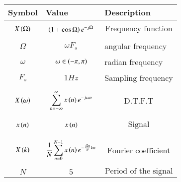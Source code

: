 \begin{tabular}{|p{2cm}|p{2.80cm}|p{2.70cm}|}
    \hline
    Symbol&Value&Description\\ \hline
    $$X\left(\Omega\right)$$&$$\left(1+\cos{\Omega}\right)e^{-j\Omega}$$&$$\text{Frequency function}$$\\\hline
    $$\Omega$$&$$\omega F_{s}$$&angular frequency\\\hline
    $$\omega$$&$$\omega \in \left(-\pi,\pi\right)$$&radian frequency\\\hline
    $$F_{s}$$&$$1Hz$$&Sampling frequency\\\hline
    $$X\left(\omega\right)$$&$$\sum^{\infty}_{n=-\infty}x\left(n\right)e^{-j\omega n}$$&$$\text{D.T.F.T}$$\\\hline
    $$x\left(n\right)$$&$$x\left(n\right)$$&$$\text{Signal}$$\\\hline
    $$X\left(k\right)$$&$$\frac{1}{N}\sum^{N-1}_{n=0}x\left(n\right)e^{-\frac{j2\pi}{N}kn}$$&$$\text{Fourier coefficient}$$\\\hline
    $$N$$&$$5$$&$$\text{Period of the signal}$$\\\hline
\end{tabular}